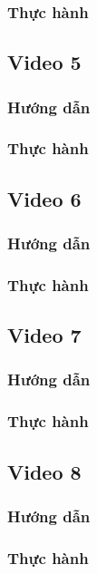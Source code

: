 \documentclass{article}
\begin{document}
\subsubsection{Thực hành}




\subsection{Video 5}
\subsubsection{Hướng dẫn}

\subsubsection{Thực hành}




\subsection{Video 6}
\subsubsection{Hướng dẫn}

\subsubsection{Thực hành}




\subsection{Video 7}
\subsubsection{Hướng dẫn}

\subsubsection{Thực hành}




\subsection{Video 8}
\subsubsection{Hướng dẫn}

\subsubsection{Thực hành}








\end{document}
